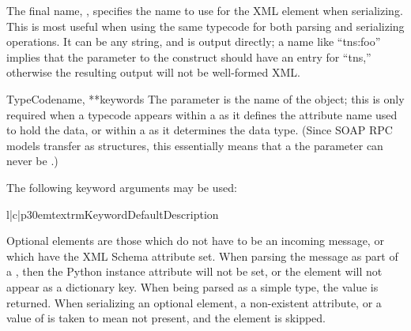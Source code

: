 The final name, , specifies the name to use for the XML element
when serializing.  This is most useful when using the same typecode for
both parsing and serializing operations.  It can be any string, and is
output directly; a name like ``tns:foo'' implies that the 
parameter to the  construct should have an entry for
``tns,'' otherwise the resulting output will not be well-formed XML.

\begin{classdesc}{TypeCode}{name, **keywords}
The  parameter is the name of the object; this is only
required when a typecode appears within a  as it defines
the attribute name used to hold the data, or within a 
as it determines the data type.
(Since SOAP RPC models transfer as structures, this essentially means that
a the  parameter can never be .)

The following keyword arguments may be used:

\begin{tableiii}{l|c|p{30em}}{textrm}{Keyword}{Default}{Description}
\end{tableiii}

Optional elements are those which do not have to be an incoming
message, or which have the XML Schema  attribute set.
When parsing the message as part of a , then the Python
instance attribute will not be set, or the element will not appear as
a dictionary key.
When being parsed as a simple type, the value  is returned.
When serializing an optional element, a non-existent attribute, or a value
of  is taken to mean not present, and the element is skipped.

\end{classdesc}

